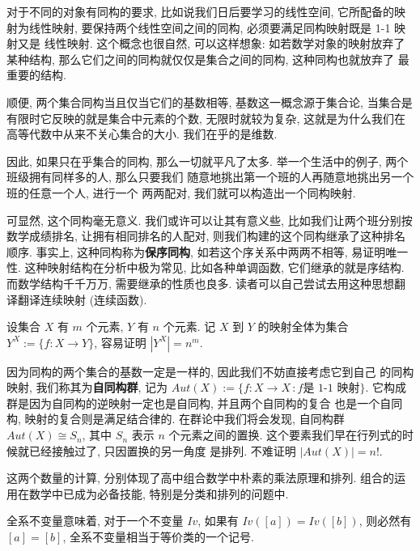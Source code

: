 \documentclass[UTF8]{book}
\begin{document}
\begin{remark}
    对于不同的对象有同构的要求, 
    比如说我们日后要学习的线性空间, 它所配备的映射为线性映射, 
    要保持两个线性空间之间的同构, 必须要满足同构映射既是 1-1 映射又是
    线性映射. 这个概念也很自然, 可以这样想象: 如若数学对象的映射放弃了
    某种结构, 那么它们之间的同构就仅仅是集合之间的同构, 这种同构也就放弃了
    最重要的结构. 

    顺便, 两个集合同构当且仅当它们的基数相等, 基数这一概念源于集合论, 
    当集合是有限时它反映的就是集合中元素的个数, 无限时就较为复杂, 
    这就是为什么我们在高等代数中从来不关心集合的大小. 
    我们在乎的是维数. 

    因此, 如果只在乎集合的同构, 那么一切就平凡了太多. 
    举一个生活中的例子, 两个班级拥有同样多的人, 那么只要我们
    随意地挑出第一个班的人再随意地挑出另一个班的任意一个人, 进行一个
    两两配对, 我们就可以构造出一个同构映射. 
    
    可显然, 这个同构毫无意义. 
    我们或许可以让其有意义些, 比如我们让两个班分别按数学成绩排名, 
    让拥有相同排名的人配对, 则我们构建的这个同构继承了这种排名顺序. 
    事实上, 这种同构称为\textbf{保序同构}, 如若这个序关系中两两不相等, 
    易证明唯一性. 这种映射结构在分析中极为常见, 比如各种单调函数, 
    它们继承的就是序结构. 而数学结构千千万万, 需要继承的性质也良多. 
    读者可以自己尝试去用这种思想翻译翻译连续映射 (连续函数).

    设集合 $X$ 有 $m$ 个元素, $Y$ 有 $n$ 个元素. 
    记 $X$ 到 $Y$ 的映射全体为集合 $Y^X :=\{f:X\to Y\}$, 
    容易证明 $ |Y^X| = n^m $. 

    因为同构的两个集合的基数一定是一样的, 因此我们不妨直接考虑它到自己
    的同构映射, 我们称其为\textbf{自同构群}, 记为 
    $Aut(X):=\{f:X\to X\,:f\mbox{是 1-1 映射}\}$. 
    它构成群是因为自同构的逆映射一定也是自同构, 并且两个自同构的复合
    也是一个自同构, 映射的复合则是满足结合律的. 
    在群论中我们将会发现, 自同构群 $Aut(X) \cong S_{n}$, 
    其中 $S_{n}$ 表示 $n$ 个元素之间的置换. 
    这个要素我们早在行列式的时候就已经接触过了, 只因置换的另一角度
    是排列. 
    不难证明 $|Aut(X)| = n!$. 

    这两个数量的计算, 分别体现了高中组合数学中朴素的乘法原理和排列. 
    组合的运用在数学中已成为必备技能, 特别是分类和排列的问题中. 
\end{remark}

全系不变量意味着, 对于一个不变量 $Iv$, 如果有 $Iv([a]) = Iv([b])$, 
则必然有 $[a] = [b]$, 全系不变量相当于等价类的一个记号. 
\end{document}
